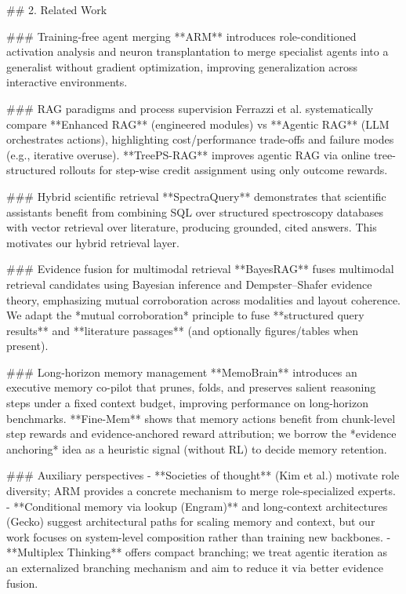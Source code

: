 ## 2. Related Work  

### Training-free agent merging  
**ARM** introduces role-conditioned activation analysis and neuron transplantation to merge specialist agents into a generalist without gradient optimization, improving generalization across interactive environments.

### RAG paradigms and process supervision  
Ferrazzi et al. systematically compare **Enhanced RAG** (engineered modules) vs **Agentic RAG** (LLM orchestrates actions), highlighting cost/performance trade-offs and failure modes (e.g., iterative overuse). **TreePS-RAG** improves agentic RAG via online tree-structured rollouts for step-wise credit assignment using only outcome rewards.

### Hybrid scientific retrieval  
**SpectraQuery** demonstrates that scientific assistants benefit from combining SQL over structured spectroscopy databases with vector retrieval over literature, producing grounded, cited answers. This motivates our hybrid retrieval layer.

### Evidence fusion for multimodal retrieval  
**BayesRAG** fuses multimodal retrieval candidates using Bayesian inference and Dempster–Shafer evidence theory, emphasizing mutual corroboration across modalities and layout coherence. We adapt the *mutual corroboration* principle to fuse **structured query results** and **literature passages** (and optionally figures/tables when present).

### Long-horizon memory management  
**MemoBrain** introduces an executive memory co-pilot that prunes, folds, and preserves salient reasoning steps under a fixed context budget, improving performance on long-horizon benchmarks. **Fine-Mem** shows that memory actions benefit from chunk-level step rewards and evidence-anchored reward attribution; we borrow the *evidence anchoring* idea as a heuristic signal (without RL) to decide memory retention.

### Auxiliary perspectives  
- **Societies of thought** (Kim et al.) motivate role diversity; ARM provides a concrete mechanism to merge role-specialized experts.  
- **Conditional memory via lookup (Engram)** and long-context architectures (Gecko) suggest architectural paths for scaling memory and context, but our work focuses on system-level composition rather than training new backbones.  
- **Multiplex Thinking** offers compact branching; we treat agentic iteration as an externalized branching mechanism and aim to reduce it via better evidence fusion.

